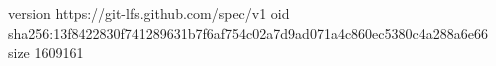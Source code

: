 version https://git-lfs.github.com/spec/v1
oid sha256:13f8422830f741289631b7f6af754c02a7d9ad071a4c860ec5380c4a288a6e66
size 1609161
